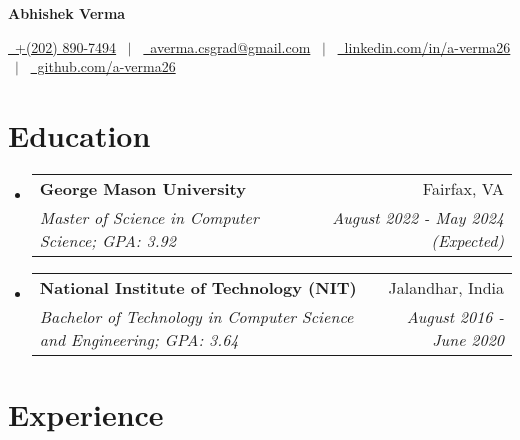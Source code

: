 \documentclass[letterpaper,10.8pt]{article}
\makeatletter
\newcommand{\resumeSubheading}[4]{
  \vspace{-1pt}\item
    \begin{tabular*}{0.97\textwidth}{l@{\extracolsep{\fill}}r}
      \textbf{#1} & #2 \\
      \textit{\small#3} & \textit{\small #4} \\
    \end{tabular*}\vspace{-5pt}
}
\newcommand{\resumeSubHeadingListStart}{\begin{itemize}[leftmargin=*]}
\newcommand{\resumeSubHeadingListEnd}{\end{itemize}}
\makeatother
\begin{document}



\begin{center}
\textbf{\fontsize{16}{28}\selectfont Abhishek Verma}
\end{center}

\begin{center}

\href{tel:+2028907494} 
{\raisebox{-0.05\height}\faPhone\ +(202) 890-7494} \ $|$ \
\href{mailto:averma.csgrad@gmail.com}
{\raisebox{-0.05\height}\faEnvelope \ averma.csgrad@gmail.com} \
$|$ \
\href{https://www.linkedin.com/in/a-verma26/}{\raisebox{-0.05\height}\faLinkedin\ linkedin.com/in/a-verma26} \ $|$ \
\href{https://github.com/a-verma26}{\raisebox{-0.05\height}\faGithub\ github.com/a-verma26} \ 
\end{center}



\section{Education}

  \resumeSubHeadingListStart

    \resumeSubheading
      {George Mason University}{Fairfax, VA}
      {Master of Science in Computer Science;  GPA: 3.92}{August 2022 - May 2024 (Expected)}
       


	    \vspace{2pt}
    \resumeSubheading
      {National Institute of Technology (NIT)}{Jalandhar, India}
      {Bachelor of Technology in Computer Science and Engineering;   GPA: 3.64 }{August 2016 - June 2020}

      
  \resumeSubHeadingListEnd



\section{Experience}
\end{document}
